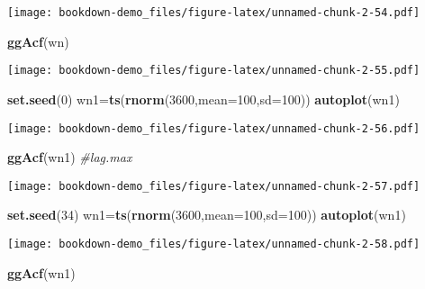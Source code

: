 \documentclass[]{book}
\newenvironment{Shaded}{\begin{snugshade}}{\end{snugshade}}
\newcommand{\CommentTok}[1]{\textcolor[rgb]{0.56,0.35,0.01}{\textit{#1}}}
\newcommand{\DataTypeTok}[1]{\textcolor[rgb]{0.13,0.29,0.53}{#1}}
\newcommand{\DecValTok}[1]{\textcolor[rgb]{0.00,0.00,0.81}{#1}}
\newcommand{\KeywordTok}[1]{\textcolor[rgb]{0.13,0.29,0.53}{\textbf{#1}}}
\newcommand{\NormalTok}[1]{#1}
\begin{document}
\texttt{[image: bookdown-demo\_files/figure-latex/unnamed-chunk-2-54.pdf]}

\begin{Shaded}
\begin{Highlighting}[]
  \KeywordTok{ggAcf}\NormalTok{(wn)}
\end{Highlighting}
\end{Shaded}

\texttt{[image: bookdown-demo\_files/figure-latex/unnamed-chunk-2-55.pdf]}

\begin{Shaded}
\begin{Highlighting}[]
  \KeywordTok{set.seed}\NormalTok{(}\DecValTok{0}\NormalTok{) }
\NormalTok{  wn1=}\KeywordTok{ts}\NormalTok{(}\KeywordTok{rnorm}\NormalTok{(}\DecValTok{3600}\NormalTok{,}\DataTypeTok{mean=}\DecValTok{100}\NormalTok{,}\DataTypeTok{sd=}\DecValTok{100}\NormalTok{))}
  \KeywordTok{autoplot}\NormalTok{(wn1)}
\end{Highlighting}
\end{Shaded}

\texttt{[image: bookdown-demo\_files/figure-latex/unnamed-chunk-2-56.pdf]}

\begin{Shaded}
\begin{Highlighting}[]
  \KeywordTok{ggAcf}\NormalTok{(wn1) }\CommentTok{#lag.max}
\end{Highlighting}
\end{Shaded}

\texttt{[image: bookdown-demo\_files/figure-latex/unnamed-chunk-2-57.pdf]}

\begin{Shaded}
\begin{Highlighting}[]
  \KeywordTok{set.seed}\NormalTok{(}\DecValTok{34}\NormalTok{) }
\NormalTok{  wn1=}\KeywordTok{ts}\NormalTok{(}\KeywordTok{rnorm}\NormalTok{(}\DecValTok{3600}\NormalTok{,}\DataTypeTok{mean=}\DecValTok{100}\NormalTok{,}\DataTypeTok{sd=}\DecValTok{100}\NormalTok{))}
  \KeywordTok{autoplot}\NormalTok{(wn1)}
\end{Highlighting}
\end{Shaded}

\texttt{[image: bookdown-demo\_files/figure-latex/unnamed-chunk-2-58.pdf]}

\begin{Shaded}
\begin{Highlighting}[]
  \KeywordTok{ggAcf}\NormalTok{(wn1)}
\end{Highlighting}
\end{Shaded}
\end{document}
